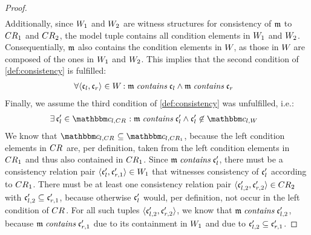 \begin{proof}
\begin{align*}
    \end{align*}
    Additionally, since $\consistencyrelation{W}{1}$ and $\consistencyrelation{W}{2}$ are witness structures for consistency of $\modeltuple{m}$ to $\consistencyrelation{CR}{1}$ and $\consistencyrelation{CR}{2}$, the model tuple contains all condition elements in $\consistencyrelation{W}{1}$ and $\consistencyrelation{W}{2}$.
    Consequentially, $\modeltuple{m}$ also contains the condition elements in $\consistencyrelation{W}{}$, as those in $\consistencyrelation{W}{}$ are composed of the ones in $\consistencyrelation{W}{1}$ and $\consistencyrelation{W}{2}$. This implies that the second condition of \autoref{def:consistency} is fulfilled:
    \begin{align*}
        &
        \forall \tupled{\conditionelement{c}{l}, \conditionelement{c}{r}} \in \consistencyrelation{W}{} : \modeltuple{m} \containsmath \conditionelement{c}{l} \land \modeltuple{m} \containsmath \conditionelement{c}{r}
    \end{align*}
    Finally, we assume the third condition of \autoref{def:consistency} was unfulfilled, i.e.: 
    \begin{align*}
        &
        \exists \conditionelement{c}{l}' \in \condition{c}{l,\consistencyrelation{CR}{}} : \modeltuple{m} \containsmath \conditionelement{c}{l}' \land \conditionelement{c}{l}' \not\in \condition{c}{l,\consistencyrelation{W}{}}
    \end{align*}
    We know that $\condition{c}{l,\consistencyrelation{CR}{}} \subseteq \condition{c}{l,\consistencyrelation{CR}{1}}$, because the left condition elements in $\consistencyrelation{CR}{}$ are, per definition, taken from the left condition elements in $\consistencyrelation{CR}{1}$ and thus also contained in $\consistencyrelation{CR}{1}$.
    Since $\modeltuple{m} \containsmath \conditionelement{c}{l}'$, there must be a consistency relation pair $\tupled{\conditionelement{c}{l}', \conditionelement{c}{r,1}'} \in \consistencyrelation{W}{1}$ that witnesses consistency of $\conditionelement{c}{l}'$ according to $\consistencyrelation{CR}{1}$.
    There must be at least one consistency relation pair $\tupled{\conditionelement{c}{l,2}', \conditionelement{c}{r,2}'} \in \consistencyrelation{CR}{2}$ with $\conditionelement{c}{l,2}' \subseteq \conditionelement{c}{r,1}'$, because otherwise $\conditionelement{c}{l}'$ would, per definition, not occur in the left condition of $\consistencyrelation{CR}{}$.
    For all such tuples $\tupled{\conditionelement{c}{l,2}', \conditionelement{c}{r,2}'}$, we know that $\modeltuple{m} \containsmath \conditionelement{c}{l,2}'$, because $\modeltuple{m} \containsmath \conditionelement{c}{r,1}'$ due to its containment in $\consistencyrelation{W}{1}$ and due to $\conditionelement{c}{l,2}' \subseteq \conditionelement{c}{r,1}'$.

\end{proof}
